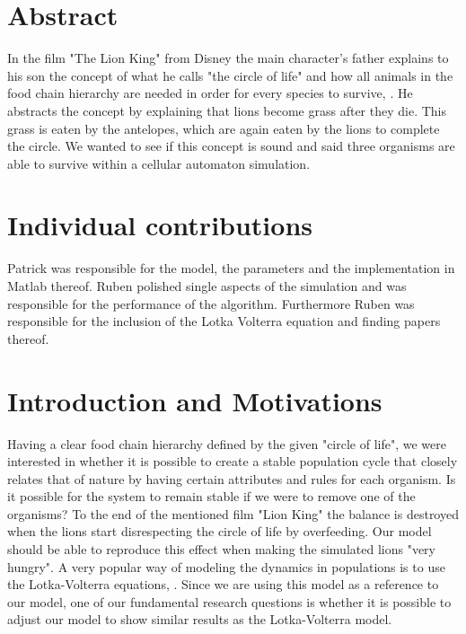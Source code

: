 \documentclass[11pt]{article}
\begin{document}

\tableofcontents

\newpage




\section{Abstract}
In the film "The Lion King" from Disney the main character's father explains to his son the concept of what he calls "the circle of life" and how all animals in the food chain hierarchy are needed in order for every species to survive, \cite{lionKing}. He abstracts the concept by explaining that lions become grass after they die. This grass is eaten by the antelopes, which are again eaten by the lions to complete the circle. We wanted to see if this concept is sound and said three organisms are able to survive within a cellular automaton simulation.

\section{Individual contributions}
Patrick was responsible for the model, the parameters and the implementation in Matlab thereof. Ruben polished single aspects of the simulation and was responsible for the performance of the algorithm. Furthermore Ruben was responsible for the inclusion of the Lotka Volterra equation and finding papers thereof.

\section{Introduction and Motivations}
Having a clear food chain hierarchy defined by the given "circle of life", we were interested in whether it is possible to create a stable population cycle that closely relates that of nature by having certain attributes and rules for each organism. Is it possible for the system to remain stable if we were to remove one of the organisms? To the end of the mentioned film "Lion King" the balance is destroyed when the lions start disrespecting the circle of life by overfeeding. Our model should be able to reproduce this effect when making the simulated lions "very hungry".
A very popular way of modeling the dynamics in populations is to use the Lotka-Volterra equations, \cite{lotkaVolterra}. Since we are using this model as a reference to our model, one of our fundamental research questions is whether it is possible to adjust our model to show similar results as the Lotka-Volterra model.
\end{document}
